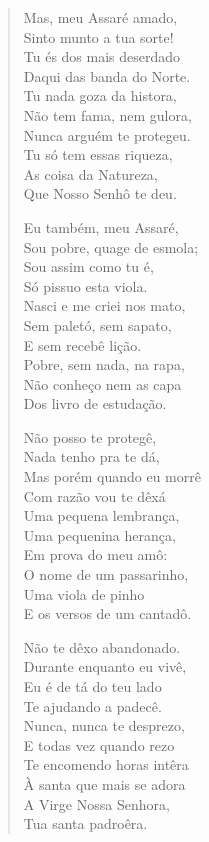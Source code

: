 \begin{verse}
Mas, meu Assaré amado,\\
Sinto munto a tua sorte!\\
Tu és dos mais deserdado\\
Daqui das banda do Norte.\\
Tu nada goza da histora,\\
Não tem fama, nem gulora,\\
Nunca arguém te protegeu.\\
Tu só tem essas riqueza,\\
As coisa da Natureza,\\
Que Nosso Senhô te deu.

Eu também, meu Assaré,\\
Sou pobre, quage de esmola;\\
Sou assim como tu é,\\
Só pissuo esta viola.\\
Nasci e me criei nos mato,\\
Sem paletó, sem sapato,\\
E sem recebê lição.\\
Pobre, sem nada, na rapa,\\
Não conheço nem as capa\\
Dos livro de estudação.

Não posso te protegê,\\
Nada tenho pra te dá,\\
Mas porém quando eu morrê\\
Com razão vou te dêxá\\
Uma pequena lembrança,\\
Uma pequenina herança,\\
Em prova do meu amô:\\
O nome de um passarinho,\\
Uma viola de pinho\\
E os versos de um cantadô.

Não te dêxo abandonado.\\
Durante enquanto eu vivê,\\
Eu é de tá do teu lado\\
Te ajudando a padecê.\\
Nunca, nunca te desprezo,\\
E todas vez quando rezo\\
Te encomendo horas intêra\\
À santa que mais se adora\\
A Virge Nossa Senhora,\\
Tua santa padroêra.


\end{verse}
